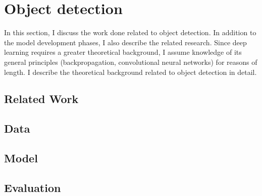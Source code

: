 \chapter{Object detection}

In this section, I discuss the work done related to object detection. In addition to the model development phases, I also describe the related research. Since deep learning requires a greater theoretical background, I assume knowledge of its general principles (backpropagation, convolutional neural networks) for reasons of length. I describe the theoretical background related to object detection in detail.

\section{Related Work}

\section{Data}

\section{Model}

\section{Evaluation}